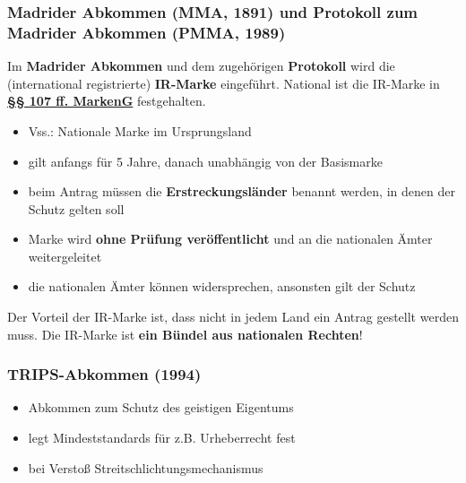 \documentclass[12pt,A4]{extarticle}
\newcommand{\highlight}[1]{\textcolor{highlightColor}{\textbf{#1}}}
\newcommand{\markenGG}[2][]{\textbf{\textcolor{markenGesetzLink}{\href{https://www.gesetze-im-internet.de/markeng/__#2.html}{§§ #1 MarkenG}}}}
\begin{document}
\subsubsection{Madrider Abkommen (MMA, 1891) und Protokoll zum Madrider Abkommen (PMMA, 1989)}
Im \textbf{Madrider Abkommen} und dem zugehörigen \textbf{Protokoll} wird die (international registrierte) \highlight{IR-Marke} eingeführt. National ist die IR-Marke in \markenGG[107 ff.]{107} festgehalten.
\begin{itemize}
  \item{Vss.: Nationale Marke im Ursprungsland}
  \item{gilt anfangs für 5 Jahre, danach unabhängig von der Basismarke}
  \item{beim Antrag müssen die \textbf{Erstreckungsländer} benannt werden, in denen der Schutz gelten soll}
  \item{Marke wird \textbf{ohne Prüfung veröffentlicht} und an die nationalen Ämter weitergeleitet}
  \item{die nationalen Ämter können widersprechen, ansonsten gilt der Schutz}
\end{itemize}
Der Vorteil der IR-Marke ist, dass nicht in jedem Land ein Antrag gestellt werden muss. Die IR-Marke ist \textbf{ein Bündel aus nationalen Rechten}!

\subsubsection{TRIPS-Abkommen (1994)}
\begin{itemize}
  \item{Abkommen zum Schutz des geistigen Eigentums}
  \item{legt Mindeststandards für z.B. Urheberrecht fest}
  \item{bei Verstoß Streitschlichtungsmechanismus}
\end{itemize}
\end{document}
